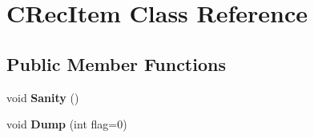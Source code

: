 \hypertarget{class_c_rec_item}{\section{C\-Rec\-Item Class Reference}
\label{class_c_rec_item}
}
\subsection*{Public Member Functions}
\begin{DoxyCompactItemize}
\item 
\hypertarget{class_c_rec_item_a8122728e04bee627e73f49dfc58dfffb}{void {\bfseries Sanity} ()}\label{class_c_rec_item_a8122728e04bee627e73f49dfc58dfffb}

\item 
\hypertarget{class_c_rec_item_a7fdf630c24d3fcd293cb5b95ad69a940}{void {\bfseries Dump} (int flag=0)}\label{class_c_rec_item_a7fdf630c24d3fcd293cb5b95ad69a940}

\end{DoxyCompactItemize}
